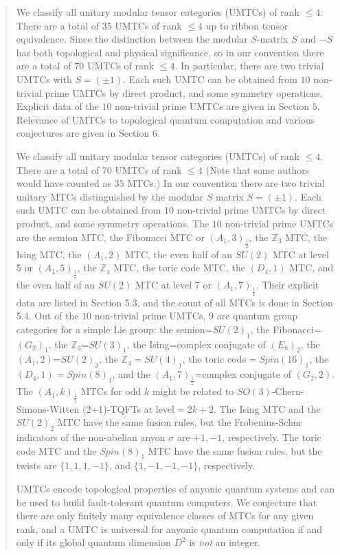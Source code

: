 \documentclass[12pt,psamsfonts]{amsart}
\newcommand{\Z}{\mathbb Z}
\numberwithin{equation}{section}
\theoremstyle{definition}
\begin{document}
\begin{abstract}

We classify all unitary modular tensor categories (UMTCs) of rank
$\leq 4$. There are a total of $35$ UMTCs of rank $\leq 4$ up to ribbon tensor equivalence.
Since the distinction between the modular $S$-matrix $S$ and $-S$ has both
topological and physical significance,
so in our convention there are a total of $70$ UMTCs of rank $\leq 4$.
In particular, there are two trivial UMTCs with $S=(\pm1)$. Each such UMTC can be obtained from
$10$ non-trivial prime UMTCs by direct product, and some symmetry
operations. Explicit data of the $10$ non-trivial prime UMTCs are given in Section $5$.
Relevance of UMTCs to topological quantum computation and various
conjectures are given in Section $6$.

\iffalse
We classify all unitary modular tensor categories (UMTCs) of rank
$\leq 4$. There are a total of $70$ UMTCs of rank $\leq 4$ (Note
that some authors would have counted as $35$ MTCs.)  In our
convention there are two trivial unitary MTCs distinguished by the
modular $S$ matrix $S=(\pm1)$. Each such UMTC can be obtained from
$10$ non-trivial prime UMTCs by direct product, and some symmetry
operations.  The $10$ non-trivial prime UMTCs are the semion MTC,
the Fibonacci MTC or $(A_1,3)_{\frac{1}{2}}$, the $\Z_3$ MTC, the
Ising MTC, the $(A_1,2)$ MTC, the even half of an $SU(2)$ MTC at
level 5 or $(A_1,5)_{\frac{1}{2}}$, the $\Z_4$ MTC, the toric code
MTC, the $(D_4,1)$ MTC, and the even half of an $SU(2)$ MTC at
level $7$ or $(A_1,7)_{\frac{1}{2}}$. Their explicit data are
listed in Section 5.3, and the count of all MTCs is done in
Section 5.4. Out of the $10$ non-trivial prime UMTCs, $9$ are
quantum group categories for a simple Lie group: the
semion=$SU(2)_1$, the Fibonacci=$(G_2)_1$, the $\Z_3$=$SU(3)_1$,
the Ising=complex conjugate of $(E_8)_2$, the $(A_1,2)$=$SU(2)_2$,
the $\Z_4=SU(4)_1$, the toric code$=Spin(16)_1$, the
$(D_4,1)=Spin(8)_1$, and the $(A_1,7)_{\frac{1}{2}}$=complex
conjugate of $(G_2,2)$. The $(A_1,k)_{\frac{1}{2}}$ MTCs for odd
$k$ might be related to $SO(3)$-Chern-Simons-Witten (2+1)-TQFTs at
level$=2k+2$. The Ising MTC and the $SU(2)_2$ MTC have the same
fusion rules, but the Frobenius-Schur indicators of the non-abelian
anyon $\sigma$ are $+1,-1$, respectively.  The toric code MTC and
the $Spin(8)_1$ MTC have the same fusion rules, but the twists are
$\{1,1,1,-1\}$, and $\{1,-1,-1,-1\}$, respectively.

UMTCs encode topological properties of anyonic quantum systems and
can be used to build fault-tolerant quantum computers. We
conjecture that there are only finitely many equivalence classes
of MTCs for any given rank, and a UMTC is universal for anyonic
quantum computation if and only if its global quantum dimension
$D^2$ is \emph{not} an integer.


\end{abstract}
\end{document}
